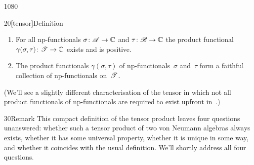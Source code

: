 \begin{parsec}{1080}
\begin{point}{20}[tensor]{Definition}
\begin{enumerate}
This implies
that for all $f \in \scrA_*$
and $g\in \scrB_*$
there is at most one $h\in \scrT_*$
with, for all~$a\in\scrA$ and $b\in\scrB$,
\begin{equation*}
	h(\gamma(a,b))\ =\  f(a)\,g(b),
\end{equation*}
which we'll call the %
for~$f$ and~$g$,
and denote by~$\Define{\gamma(f,g)}$%
(when it exists).
\item
\label{tensor-2}
For all np-functionals
$\sigma\colon \mathscr{A}\to\mathbb{C}$
and $\tau\colon \mathscr{B}\to\mathbb{C}$
the product functional $\gamma(\sigma,\tau)\colon \mathscr{T}\to\mathbb{C}$
exists and is positive.
\item
\label{tensor-3}
The product functionals 
$\gamma(\sigma,\tau)$
of np-functionals~$\sigma$ and~$\tau$ form a faithful collection
of np-functionals on~$\mathscr{T}$.
\end{enumerate}
(We'll see a slightly different characterisation
of the tensor
in which not all product functionals of np-functionals
are required to exist upfront 
in~.)
\end{point}
\begin{point}{30}{Remark}%
This compact definition of the tensor product
leaves four questions unanswered:
whether such a tensor product of two von Neumann algebras
always exists,
whether it has some  universal property,
whether it is unique in some way,
and whether it coincides with the usual definition.
We'll shortly address all four questions.
\end{point}
\end{parsec}
